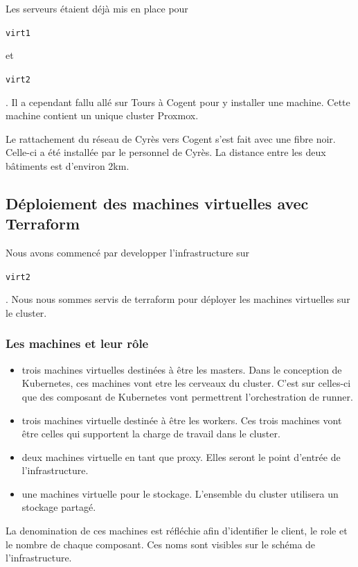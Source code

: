 \documentclass[12pt]{article}
\begin{document}
Les serveurs étaient déjà mis en place pour \begin{code}\texttt{virt1}\end{code} et \begin{code}\texttt{virt2}\end{code}. 
Il a cependant fallu allé sur Tours à Cogent pour y installer une machine. 
Cette machine contient un unique \gls{cluster} \gls{Proxmox}. 

Le rattachement du réseau de Cyrès vers Cogent s'est fait avec une fibre noir.
Celle-ci a été installée par le personnel de Cyrès.
La distance entre les deux bâtiments est d'environ 2km.

\subsection{Déploiement des machines virtuelles avec Terraform}
Nous avons commencé par developper l'infrastructure sur \begin{code}\texttt{virt2}\end{code}. 
Nous nous sommes servis de terraform pour déployer les machines virtuelles sur le \gls{cluster}. 

\subsubsection{Les machines et leur rôle}
\begin{itemize}
    \item trois machines virtuelles destinées à être les masters. 
    Dans le conception de \gls{Kubernetes}, ces machines vont etre les cerveaux du \gls{cluster}.
    C'est sur celles-ci que des composant de \gls{Kubernetes} vont permettrent l'orchestration de runner.
    \item trois machines virtuelle destinée à être les workers. 
    Ces trois machines vont être celles qui supportent la charge de travail dans le \gls{cluster}.
    \item deux machines virtuelle en tant que proxy. 
    Elles seront le point d'entrée de l'infrastructure. 
    \item une machines virtuelle pour le stockage. 
    L'ensemble du \gls{cluster} utilisera un stockage partagé.
\end{itemize}

La denomination de ces machines est réfléchie afin d'identifier le client, le role et le nombre de chaque composant. 
Ces noms sont visibles sur le schéma de l'infrastructure.
\end{document}
